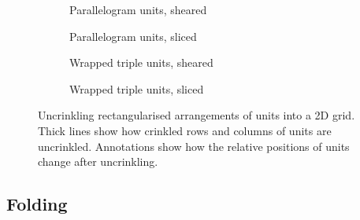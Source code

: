 			\begin{figure}
				\center
				\begin{subfigure}[b]{0.48\linewidth}
					\center
					
					\caption{Parallelogram units, sheared}
					\label{fig:uncrinkling-node-sheared}
				\end{subfigure}
				\begin{subfigure}[b]{0.48\linewidth}
					\center
					
					\caption{Parallelogram units, sliced}
					\label{fig:uncrinkling-node-sliced}
				\end{subfigure}
				
				\vspace{1cm}
				
				\begin{subfigure}[b]{0.48\linewidth}
					\center
					
					\caption{Wrapped triple units, sheared}
					\label{fig:uncrinkling-sheared}
				\end{subfigure}
				\begin{subfigure}[b]{0.48\linewidth}
					\center
					
					\caption{Wrapped triple units, sliced}
					\label{fig:uncrinkling-sliced}
				\end{subfigure}
				
				\vspace{1em}
				
				\caption[Uncrinkling units into a 2D grid.]%
				{Uncrinkling rectangularised arrangements of units into a 2D
				grid. Thick lines show how crinkled rows and columns of units are
				uncrinkled.  Annotations show how the relative positions of units
				change after uncrinkling.}
				\label{fig:uncrinkling}
			\end{figure}
			
		
		\subsection{Folding}
			
